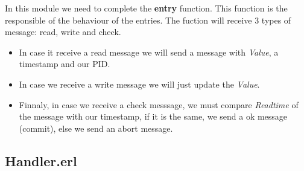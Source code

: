 \documentclass[a4paper, 10pt]{article}
\begin{document}
In this module we need to complete the \textbf{entry} function. This function is the responsible of the behaviour of the entries. The fuction will receive 3 types of message: read, write and check. 

\begin{itemize}
  \item  In case it receive a read message we will send a message with \textit{Value}, a timestamp and our PID.
  \item In case we receive a write message we will just update the \textit{Value}. 
  \item Finnaly, in case we receive a check messsage, we must compare \textit{Readtime} of the message with our timestamp, if it is the same, we send a ok message (commit), else we send an abort message.
\end{itemize}


\subsection{Handler.erl}
\end{document}
